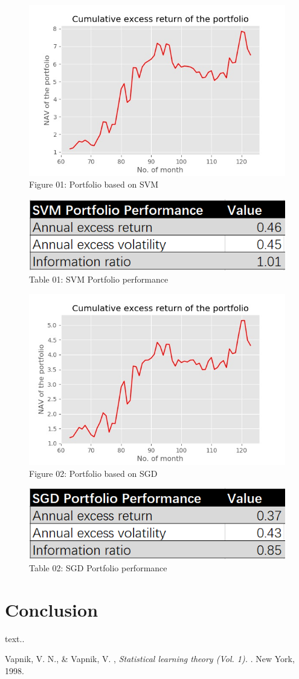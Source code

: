 \documentclass[12pt]{article}
\begin{document}
\begin{figure}[h]
	\centering
	\includegraphics[width=0.6\linewidth]{pic//NAV_SVM.jpg}
	\caption*{Figure 01: Portfolio based on SVM}
	\label{fig:label}
\end{figure}

\begin{figure}[h]
	\centering
	\includegraphics[width=0.6\linewidth]{pic//SVM_Performance.png}
	\caption*{Table 01: SVM Portfolio performance}
	\label{fig:label}
\end{figure}
\newpage
\begin{figure}[h]
\centering
\includegraphics[width=0.6\linewidth]{pic//NAV_SGD.jpg}
\caption*{Figure 02: Portfolio based on SGD}
\label{fig:label}
\end{figure}

\begin{figure}[h]
	\centering
	\includegraphics[width=0.6\linewidth]{pic//SGD_Performance.png}
	\caption*{Table 02: SGD Portfolio performance}
	\label{fig:label}
\end{figure}



\section{Conclusion} %

text..

\begin{thebibliography}{999}
	
	Vapnik, V. N., \& Vapnik, V. ,
	\emph{Statistical learning theory
		(Vol. 1). }.
	New York,
	1998.
	
\end{thebibliography}
\end{document}
